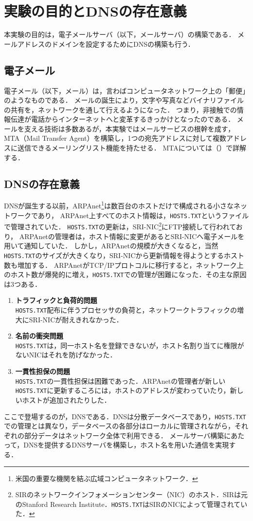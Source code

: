 \chapter{実験の目的とDNSの存在意義}
本実験の目的は，電子メールサーバ（以下，メールサーバ）の構築である．
メールアドレスのドメインを設定するためにDNSの構築も行う．
\section{電子メール}
電子メール（以下，メール）は，言わばコンピュータネットワーク上の「郵便」のようなものである．
メールの誕生により，文字や写真などバイナリファイルの共有を，ネットワークを通して行えるようになった．
つまり，非接触での情報伝達が電話からインターネットへと変革するきっかけとなったのである．
メールを支える技術は多数あるが，本実験ではメールサービスの根幹を成す，MTA（Mail Transfer Agent）を構築し，1つの宛先アドレスに対して複数アドレスに送信できるメーリングリスト機能を持たせる．
MTAについては（）で詳解する．
\section{DNSの存在意義}
DNSが誕生する以前，ARPAnet\footnote{米国の重要な機関を結ぶ広域コンピュータネットワーク\cite[p.1]{DNSBIND}．}は数百台のホストだけで構成される小さなネットワークであり，
ARPAnet上すべてのホスト情報は，\texttt{HOSTS.TXT}というファイルで管理されていた．
\texttt{HOSTS.TXT}の更新は，SRI-NIC\footnote{SIRのネットワークインフォメーションセンター（NIC）のホスト．SIRは元のStanford Research Institute．\texttt{HOSTS.TXT}はSIRのNICによって管理されていた．}にFTP接続して行われており，
ARPAnetの管理者は，ホスト情報に変更があるとSRI-NICへ電子メールを用いて通知していた．
しかし，ARPAnetの規模が大きくなると，当然\texttt{HOSTS.TXT}のサイズが大きくなり，SRI-NICから更新情報を得ようとするホスト数も増加する\cite[p.3]{DNSBIND}．
ARPAnetがTCP/IPプロトコルに移行すると，ネットワーク上のホスト数が爆発的に増え，\texttt{HOSTS.TXT}での管理が困難になった．その主な原因は3つある．
\begin{enumerate}
      \item \textbf{トラフィックと負荷的問題}\\
            \texttt{HOSTS.TXT}配布に伴うプロセッサの負荷と，ネットワークトラフィックの増大にSRI-NICが耐えきれなかった．
      \item \textbf{名前の衝突問題}\\
            \texttt{HOSTS.TXT}は，同一ホスト名を登録できないが，ホスト名割り当てに権限がないNICはそれを防げなかった．
      \item \textbf{一貫性担保の問題}\\
            \texttt{HOSTS.TXT}の一貫性担保は困難であった．ARPAnetの管理者が新しい\texttt{HOSTS.TXT}に更新するころには，ホストのアドレスが変わっていたり，新しいホストが追加されたりした．
\end{enumerate}
\hfill\cite[p.4]{DNSBIND}\par
ここで登場するのが，DNSである．DNSは分散データベースであり，\texttt{HOSTS.TXT}での管理とは異なり，データベースの各部分はローカルに管理されながら，それぞれの部分データはネットワーク全体で利用できる\cite[p.5]{DNSBIND}．
メールサーバ構築にあたって，DNSを提供するDNSサーバを構築し，ホスト名を用いた通信を実現する．
